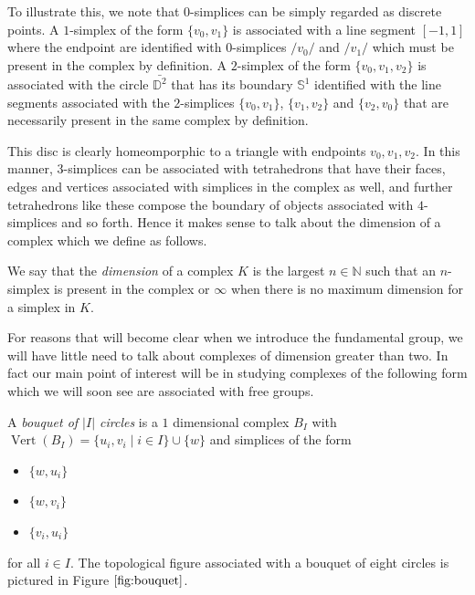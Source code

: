 To illustrate this, we note that $0$-simplices can be simply regarded as discrete points. A $1$-simplex of the form $\{ v_0, v_1 \}$ is associated with a line segment $[-1,1]$ where the endpoint are identified with $0$-simplices $/{v_0 /}$ and $/{v_1 /}$ which must be present in the complex by definition. A $2$-simplex of the form $\{ v_0,v_1,v_2 \}$ is associated with the circle $\bar{\mathbb{D}^2}$ that has its boundary $\mathbb{S}^1$ identified with the line segments associated with the $2$-simplices $\{ v_0,v_1 \}$, $\{ v_1,v_2 \}$ and $\{ v_2,v_0 \}$ that are necessarily present in the same complex by definition.

This disc is clearly homeomporphic to a triangle with endpoints $v_0,v_1,v_2$. In this manner, $3$-simplices can be associated with tetrahedrons that have their faces, edges and vertices associated with simplices in the complex as well, and further tetrahedrons like these compose the boundary of objects associated with $4$-simplices and so forth. Hence it makes sense to talk about the dimension of a complex which we define as follows.

\begin{definition}
  We say that the \emph{dimension} of a complex $K$ is the largest  $n \in \mathbb{N}$ such that an $n$-simplex is present in the complex or $\infty$ when there is no maximum dimension for a simplex in $K$.
\end{definition}

For reasons that will become clear when we introduce the fundamental group, we will have little need to talk about complexes of dimension greater than two. In fact our main point of interest will be in studying complexes of the following form which we will soon see are associated with free groups.

\begin{example}
  \label{exmp:bouq}
  A \emph{bouquet of $|I|$ circles} is a $1$ dimensional complex $B_I$ with $\operatorname{Vert}(B_I) = \{u_i,v_i \mid i \in I \} \cup \{ w \}$ and simplices of the form
\begin{itemize}
\item $\{ w,u_i \}$
\item $\{ w, v_i \}$
\item $\{ v_i,u_i\}$
\end{itemize}
for all $i \in I$. The topological figure associated with a bouquet of eight circles is pictured in Figure $\ref{fig:bouquet}$.
\end{example}

